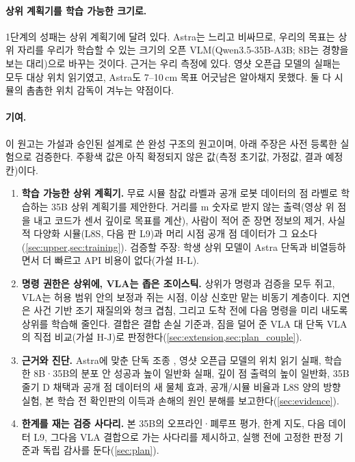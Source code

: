 \paragraph{상위 계획기를 학습 가능한 크기로.} 1단계의 성패는 상위 계획기에 달려 있다. Astra는 느리고 비싸므로, 우리의 목표는 상위 자리를 우리가 학습할 수 있는 크기의 오픈 VLM(Qwen3.5-35B-A3B; 8B는 경향을 보는 대리)으로 바꾸는 것이다.  근거는 우리 측정에 있다. 영샷 오픈급 모델의 실패는 모두 대상 위치 읽기였고, Astra도 7--10\,cm 목표 어긋남은 알아채지 못했다. 둘 다 시뮬의 촘촘한 위치 감독이 겨누는 약점이다.

\paragraph{기여.} 이 원고는 가설과 승인된 설계로 쓴 완성 구조의 원고이며, 아래 주장은 사전 등록한 실험으로 검증한다. 주황색 값은 아직 확정되지 않은 값(측정 초기값, 가정값, 결과 예정 칸)이다.
\begin{enumerate}
  \item \textbf{학습 가능한 상위 계획기.} 무료 시뮬 참값 라벨과 공개 로봇 데이터의 점 라벨로 학습하는 35B 상위 계획기를 제안한다. 거리를 m 숫자로 받지 않는 출력(영상 위 점을 내고 코드가 센서 깊이로 목표를 계산), 사람이 적어 준 장면 정보의 제거, 사실적 다양화 시뮬(L8S, 다음 판 L9)과 머리 시점 공개 점 데이터가 그 요소다(\cref{sec:upper,sec:training}). 검증할 주장: 학생 상위 모델이 Astra 단독과 비열등하면서 더 빠르고 API 비용이 없다(가설 H-L).
  \item \textbf{명령 권한은 상위에, VLA는 좁은 조이스틱.} 상위가 명령과 검증을 모두 쥐고, VLA는 허용 범위 안의 보정과 쥐는 시점, 이상 신호만 맡는 비동기 계층이다. 지연은 사건 기반 조기 재질의와 청크 겹침, 그리고 도착 전에 다음 명령을 미리 내도록 상위를 학습해 줄인다. 결합은 결합 손실 기준과, 짐을 덜어 준 VLA 대 단독 VLA의 직접 비교(가설 H-J)로 판정한다(\cref{sec:extension,sec:plan_couple}).
  \item \textbf{근거와 진단.} Astra에 맞춘 단독 조종 , 영샷 오픈급 모델의 위치 읽기 실패, 학습한 8B·35B의 분포 안 성공과 높이 일반화 실패, 깊이 점 출력의 높이 일반화, 35B 줄기 D 채택과 공개 점 데이터의 새 물체 효과, 공개/시뮬 비율과 L8S 양의 방향 실험, 본 학습 전 확인판의 이득과 손해의 원인 분해를 보고한다(\cref{sec:evidence}).
  \item \textbf{한계를 재는 검증 사다리.} 본 35B의 오프라인·폐루프 평가, 한계 지도, 다음 데이터 L9, 그다음 VLA 결합으로 가는 사다리를 제시하고, 실행 전에 고정한 판정 기준과 독립 감사를 둔다(\cref{sec:plan}).
\end{enumerate}
